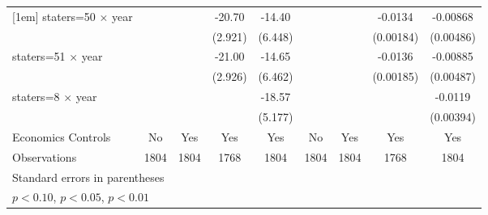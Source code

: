 {\begin{longtable}{l*{8}{c}}
[1em]
staters=50 $\times$ year&                     &                     &      -20.70\sym{***}&      -14.40\sym{**} &                     &                     &     -0.0134\sym{***}&    -0.00868\sym{*}  \\
                    &                     &                     &     (2.921)         &     (6.448)         &                     &                     &   (0.00184)         &   (0.00486)         \\
[1em]
staters=51 $\times$ year&                     &                     &      -21.00\sym{***}&      -14.65\sym{**} &                     &                     &     -0.0136\sym{***}&    -0.00885\sym{*}  \\
                    &                     &                     &     (2.926)         &     (6.462)         &                     &                     &   (0.00185)         &   (0.00487)         \\
[1em]
staters=8 $\times$ year&                     &                     &                     &      -18.57\sym{***}&                     &                     &                     &     -0.0119\sym{***}\\
                    &                     &                     &                     &     (5.177)         &                     &                     &                     &   (0.00394)         \\
[1em]
Economics Controls  &          No         &         Yes         &         Yes         &         Yes         &          No         &         Yes         &         Yes         &         Yes         \\
\hline
Observations        &        1804         &        1804         &        1768         &        1804         &        1804         &        1804         &        1768         &        1804         \\
\hline\hline
\multicolumn{9}{l}{\footnotesize Standard errors in parentheses}\\
\multicolumn{9}{l}{\footnotesize \sym{*} \(p<0.10\), \sym{**} \(p<0.05\), \sym{***} \(p<0.01\)}\\
\end{longtable}
}
